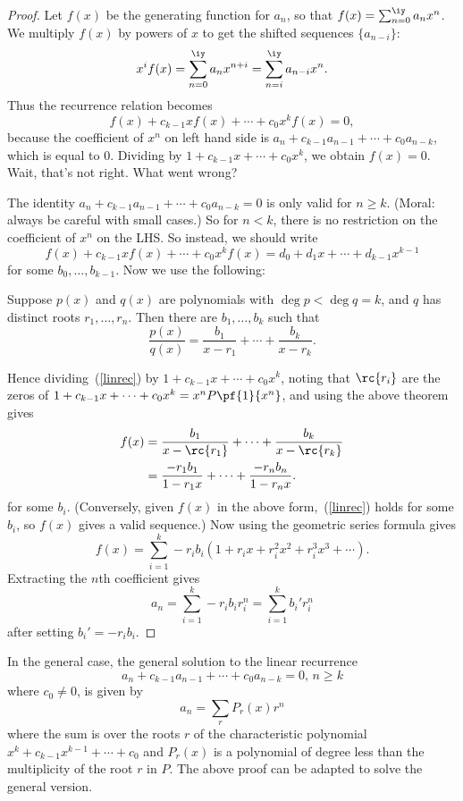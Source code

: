 \begin{proof}
Let $f(x)$ be the generating function for $a_n$, so that $f(x)=\sum_{n=0}^{\iy} a_n x^n$. We multiply $f(x)$ by powers of $x$ to get the shifted sequences $\{a_{n-i}\}$:
\[
x^if(x)=\sum_{n=0}^{\iy} a_n x^{n+i}=\sum_{n=i}^{\iy} a_{n-i} x^n.
\]
Thus the recurrence relation becomes
\[
f(x)+c_{k-1}xf(x)+\cdots +c_0x^kf(x)=0,
\]
because the coefficient of $x^n$ on left hand side is $a_n+c_{k-1}a_{n-1}+\cdots +c_0a_{n-k}$, which is equal to 0. Dividing by $1+c_{k-1}x+\cdots +c_0x^k$, we obtain $f(x)=0$. Wait, that's not right. What went wrong?

The identity $a_n+c_{k-1}a_{n-1}+\cdots +c_0a_{n-k}=0$ is only valid for $n\ge k$. (Moral: always be careful with small cases.) So for $n<k$, there is no restriction on the coefficient of $x^n$ on the LHS. So instead, we should write
\begin{equation}\label{linrec}
f(x)+c_{k-1}xf(x)+\cdots +c_0x^kf(x)=d_0+d_1x+\cdots +d_{k-1}x^{k-1}
\end{equation}
for some $b_0,\ldots, b_{k-1}$. Now we use the following:
\begin{thm}
Suppose $p(x)$ and $q(x)$ are polynomials with $\deg p<\deg q=k$, and $q$ has distinct roots $r_1,\ldots, r_n$. Then there are $b_1,\ldots, b_k$ such that
\[
\frac{p(x)}{q(x)}=\frac{b_1}{x-r_1}+\cdots +\frac{b_k}{x-r_k}.
\]
\end{thm}
Hence dividing~(\ref{linrec}) by $1+c_{k-1}x+\cdots +c_0x^k$, noting that $\rc{r_i}$ are the zeros of $1+c_{k-1}x+\cdots +c_0x^k=x^nP\pf{1}{x^n}$, and using the above theorem gives
\begin{align*}
f(x)&=\frac{b_1}{x-\rc{r_1}}+\cdots +\frac{b_k}{x-\rc{r_k}}\\
&=\frac{-r_1b_1}{1-r_1x}+\cdots +\frac{-r_nb_n}{1-r_nx}.
\end{align*}
for some $b_i$. 
(Conversely, given $f(x)$ in the above form,~(\ref{linrec}) holds for some $b_i$, so $f(x)$ gives a valid sequence.) 
Now using the geometric series formula gives
\[
f(x)=\sum_{i=1}^k -r_ib_i(1+r_ix+r_i^2x^2+r_i^3x^3+\cdots ).
\]
Extracting the $n$th coefficient gives
\[
a_n=\sum_{i=1}^k -r_ib_i r_i^n=\sum_{i=1}^kb_i'r_i^n
\]
after setting $b_i'=-r_ib_i$.
\end{proof}
\begin{rem}
In the general case, the general solution to the linear recurrence
\[
a_n+c_{k-1}a_{n-1}+\cdots +c_0a_{n-k}=0,\,n\ge k
\]
where $c_0\ne 0$, 
is given by
\[
a_n=\sum_{r}P_r(x)r^n
\]
where the sum is over the roots $r$ of the characteristic polynomial $x^k+c_{k-1}x^{k-1}+\cdots +c_0$ and $P_r(x)$ is a polynomial of degree less than the multiplicity of the root $r$ in $P$. The above proof can be adapted to solve the general version.
\end{rem}
